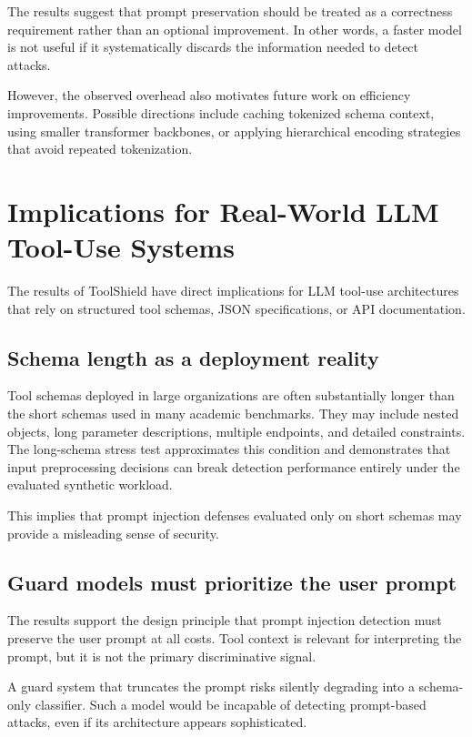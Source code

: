 The results suggest that prompt preservation should be treated as a correctness requirement rather than an optional improvement. In other words, a faster model is not useful if it systematically discards the information needed to detect attacks.

However, the observed overhead also motivates future work on efficiency improvements. Possible directions include caching tokenized schema context, using smaller transformer backbones, or applying hierarchical encoding strategies that avoid repeated tokenization.

\section{Implications for Real-World LLM Tool-Use Systems}
\label{subsec:discussion_practical}

The results of ToolShield have direct implications for LLM tool-use architectures that rely on structured tool schemas, JSON specifications, or API documentation.

\subsection{Schema length as a deployment reality}

Tool schemas deployed in large organizations are often substantially longer than the short schemas used in many academic benchmarks. They may include nested objects, long parameter descriptions, multiple endpoints, and detailed constraints. The long-schema stress test approximates this condition and demonstrates that input preprocessing decisions can break detection performance entirely under the evaluated synthetic workload.

This implies that prompt injection defenses evaluated only on short schemas may provide a misleading sense of security.

\subsection{Guard models must prioritize the user prompt}

The results support the design principle that prompt injection detection must preserve the user prompt at all costs. Tool context is relevant for interpreting the prompt, but it is not the primary discriminative signal.

A guard system that truncates the prompt risks silently degrading into a schema-only classifier. Such a model would be incapable of detecting prompt-based attacks, even if its architecture appears sophisticated.

